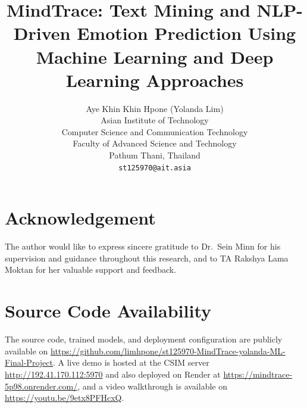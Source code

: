 \documentclass[10pt,twocolumn,letterpaper]{article}
\title{MindTrace: Text Mining and NLP-Driven Emotion Prediction Using Machine Learning and Deep Learning Approaches}
\author{Aye Khin Khin Hpone (Yolanda Lim)\\
Asian Institute of Technology\\
Computer Science and Communication Technology\\
Faculty of Advanced Science and Technology\\
Pathum Thani, Thailand\\
{\tt\small st125970@ait.asia}
}
\begin{document}
\raggedbottom



\maketitle









\section*{Acknowledgement}
The author would like to express sincere gratitude to Dr.\ Sein Minn for his supervision and guidance throughout this research, and to TA Rakshya Lama Moktan for her valuable support and feedback.

\section*{Source Code Availability}
The source code, trained models, and deployment configuration are publicly available on
\href{https://github.com/limhpone/st125970-MindTrace-yolanda-ML-Final-Project}{https://github.com/limhpone/st125970-MindTrace-yolanda-ML-Final-Project}.
A live demo is hosted at the CSIM server
\href{http://192.41.170.112:5970/}{http://192.41.170.112:5970} and also deployed on Render at \href{https://mindtrace-5p98.onrender.com/}{https://mindtrace-5p98.onrender.com/},
and a video walkthrough is available on
\href{https://youtu.be/9etx8PFHcxQ}{https://youtu.be/9etx8PFHcxQ}.

{
    \small
    
    
}


\end{document}
